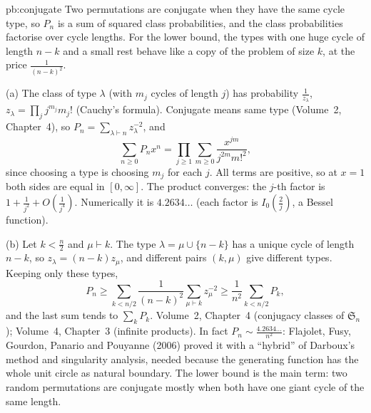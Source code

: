 \begin{solution}{pb:conjugate}
\idea Two permutations are conjugate when they have the same cycle type, so $P_n$ is a sum of squared class probabilities, and
the class probabilities factorise over cycle lengths. For the lower bound, the types with one huge cycle of length $n-k$ and a
small rest behave like a copy of the problem of size $k$, at the price $\frac1{(n-k)^2}$.

\writeup (a) The class of type $\lambda$ (with $m_j$ cycles of length $j$) has probability $\frac1{z_\lambda}$, $z_\lambda=\prod_jj^{m_j}m_j!$
(Cauchy's formula). Conjugate means same type (Volume~2, Chapter~4), so $P_n=\sum_{\lambda\vdash n}z_\lambda^{-2}$, and
\[
\sum_{n\ge0}P_nx^n=\prod_{j\ge1}\sum_{m\ge0}\frac{x^{jm}}{j^{2m}m!^2},
\]
since choosing a type is choosing $m_j$ for each $j$. All terms are positive, so at $x=1$ both sides are equal in $[0,\infty]$. The
product converges: the $j$-th factor is $1+\frac1{j^2}+O(\frac1{j^4})$. Numerically it is $4.2634\ldots$ (each factor is
$I_0(\frac2j)$, a Bessel function).

(b) Let $k<\frac n2$ and $\mu\vdash k$. The type $\lambda=\mu\cup\{n-k\}$ has a unique cycle of length $n-k$, so
$z_\lambda=(n-k)z_\mu$, and different pairs $(k,\mu)$ give different types. Keeping only these types,
\[
P_n\ge\sum_{k<n/2}\frac1{(n-k)^2}\sum_{\mu\vdash k}z_\mu^{-2}\ge\frac1{n^2}\sum_{k<n/2}P_k,
\]
and the last sum tends to $\sum_kP_k$.
\tools Volume~2, Chapter~4 (conjugacy classes of $\mathfrak S_n$); Volume~4, Chapter~3 (infinite products).
\leads In fact $P_n\sim\frac{4.2634\ldots}{n^2}$: Flajolet, Fusy, Gourdon, Panario and Pouyanne (2006) proved it with a ``hybrid'' of
Darboux's method and singularity analysis, needed because the generating function has the whole unit circle as natural boundary.
The lower bound is the main term: two random permutations are conjugate mostly when both have one giant cycle of the same length.
\end{solution}

